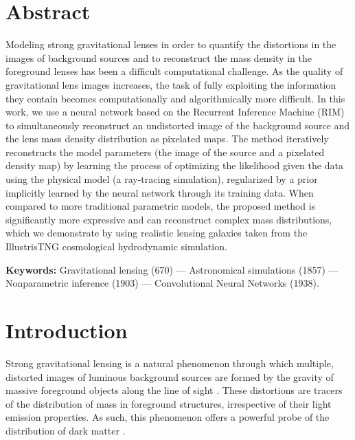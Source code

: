 \section*{Abstract}
Modeling strong gravitational lenses in order to 
quantify the distortions in the images of background sources and 
to reconstruct the mass density in the foreground lenses has been a difficult computational challenge. 
As the quality of gravitational lens images increases, the task of fully exploiting the information they contain 
becomes computationally and algorithmically more difficult. 
In this work, we use a neural network based on the Recurrent Inference Machine (RIM) to simultaneously reconstruct an undistorted 
image of the background source and the lens mass density distribution as pixelated maps. 
The method iteratively reconstructs the model parameters (the image of the source and a pixelated density map) by learning 
the process of optimizing the likelihood given the data using the physical model (a ray-tracing simulation), regularized
by a prior implicitly learned by the neural network through its training data. When compared to more traditional parametric models, 
the proposed method is significantly more expressive and can reconstruct complex mass distributions, 
which we demonstrate by using realistic lensing galaxies taken from the IllustrisTNG cosmological hydrodynamic simulation. 

\textbf{Keywords:} Gravitational lensing (670) ---
        Astronomical simulations (1857) ---
        Nonparametric inference (1903) ---
        Convolutional Neural Networks (1938).


\section{Introduction}

Strong gravitational lensing is a natural phenomenon through which multiple, distorted images of luminous background sources are formed by the gravity of  massive foreground objects along the line of sight 
\citep[e.g.,][]{Viera2013,Marrone2018,Rizzo2020,Sun2021}. 
These distortions are tracers of the distribution of mass in foreground structures, irrespective of their light emission properties. 
As such, this phenomenon offers a powerful probe of the distribution of 
dark matter \citep[e.g.,][]{Dala2002,Treu2004,Hezaveh2016,Gilman2020,Gilman2021}.


